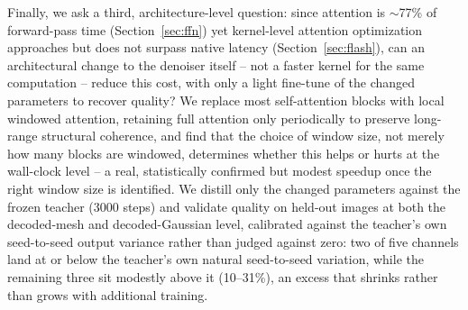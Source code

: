 \documentclass[11pt]{article}
\begin{document}
Finally, we ask a third, architecture-level question: since attention is $\sim$77\% of
forward-pass time (Section~\ref{sec:ffn}) yet kernel-level attention optimization approaches but
does not surpass native latency (Section~\ref{sec:flash}), can an architectural change to the
denoiser itself -- not a faster kernel for the same computation -- reduce this cost, with only a
light fine-tune of the changed parameters to recover quality? We replace most self-attention
blocks with local windowed attention, retaining full attention only periodically to preserve
long-range structural coherence, and find that the choice of window size, not merely how many
blocks are windowed, determines whether this helps or hurts at the wall-clock level -- a real,
statistically confirmed but modest speedup once the right window size is identified. We distill
only the changed parameters against the frozen teacher (3000 steps) and validate quality on
held-out images at both the decoded-mesh and decoded-Gaussian level, calibrated against the
teacher's own seed-to-seed output variance rather than judged against zero: two of five channels
land at or below the teacher's own natural seed-to-seed variation, while the remaining three sit
modestly above it (10--31\%), an excess that shrinks rather than grows with additional training.
\end{document}
